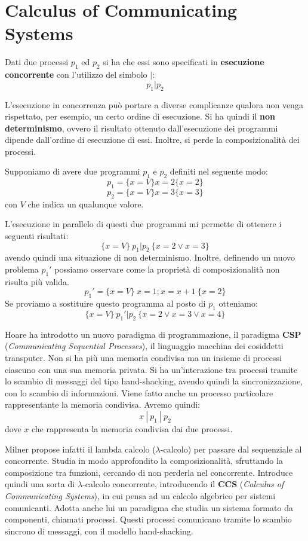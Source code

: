 \chapter{Calculus of Communicating Systems}
Dati due processi $p_1$ ed $p_2$ si ha che essi sono specificati in
\textbf{esecuzione concorrente} con l'utilizzo del simbolo $|$:
$$p_1 | p_2$$

L'esecuzione in concorrenza può portare a diverse complicanze qualora non venga
rispettato, per esempio, un certo ordine di esecuzione. Si ha quindi il
\textbf{non determinismo}, ovvero il risultato ottenuto dall'esecuzione dei
programmi dipende dall'ordine di esecuzione di essi. Inoltre, si perde la
composizionalità dei processi.
\begin{esempio}
    Supponiamo di avere due programmi $p_1$ e $p_2$ definiti nel seguente
    modo: $$p_1 =\{x = V\} x = 2 \{x = 2\}$$ $$p_2 =\{x = V\} x = 3 \{x = 3\}$$
    con $V$ che indica un qualunque valore.

    L'esecuzione in parallelo di questi due programmi mi permette di ottenere i
    seguenti risultati: $$ \{x = V\} \ p_1 | p_2 \ \{x = 2 \lor x = 3\}$$ avendo
    quindi una situazione di non determinismo. Inoltre, definendo un nuovo
    problema $p_1'$ possiamo osservare come la proprietà di composizionalità non
    risulta più valida. $$p_1' = \{x = V\} \ x = 1; x = x + 1 \ \{x = 2\}$$
    Se proviamo a sostituire questo programma al posto di $p_1$ otteniamo:
    $$ \{x = V\} \ p_1' | p_2 \ \{x = 2 \lor x = 3 \lor x = 4\}$$
\end{esempio}

Hoare ha introdotto un nuovo paradigma di programmazione, il paradigma \textbf{CSP}
(\textit{Communicating Sequential Processes}), il linguaggio macchina dei cosiddetti
transputer. Non si ha più una memoria condivisa ma un insieme di processi ciascuno
con una sua memoria privata. Si ha un'interazione tra processi tramite lo scambio
di messaggi del tipo hand-shacking, avendo quindi la sincronizzazione, con lo scambio
di informazioni. Viene fatto anche un processo particolare rappresentante la memoria
condivisa. Avremo quindi: $$x \ | \ p_1 \ | \ p_2$$ dove $x$ che rappresenta la
memoria condivisa dai due processi.

Milner propose infatti il lambda calcolo ($\lambda$-calcolo) per passare dal
sequenziale al concorrente. Studia in modo approfondito la composizionalità,
sfruttando la composizione tra funzioni, cercando di non perderla nel concorrente.
Introduce quindi una sorta di $\lambda$-calcolo concorrente, introducendo il
\textbf{CCS} (\textit{Calculus of Communicating Systems}), in cui pensa ad un
calcolo algebrico per sistemi comunicanti. Adotta anche lui un paradigma che
studia un sistema formato da componenti, chiamati processi. Questi processi
comunicano tramite lo scambio sincrono di messaggi, con il modello hand-shacking.

